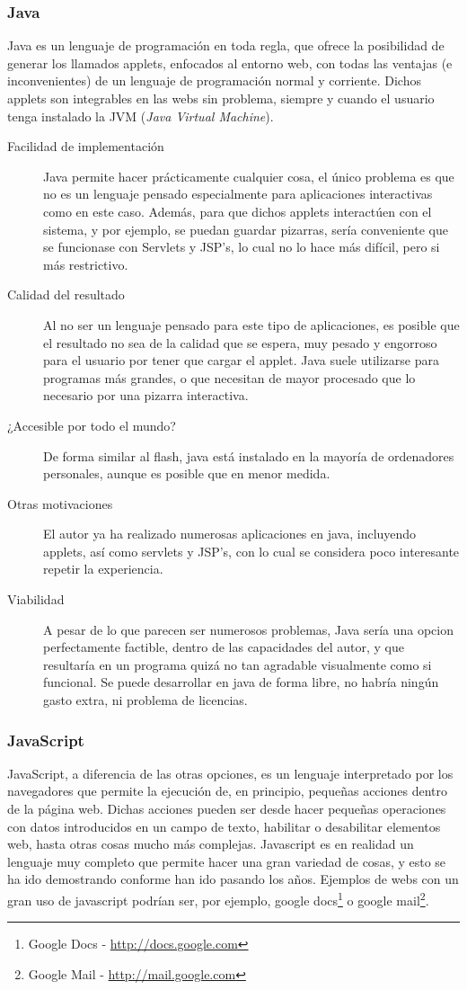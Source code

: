 \subsubsection{Java}
Java es un lenguaje de programación en toda regla, que ofrece la posibilidad de generar los llamados applets, enfocados al entorno web, con todas las ventajas (e inconvenientes) de un lenguaje de programación normal y corriente. Dichos applets son integrables en las webs sin problema, siempre y cuando el usuario tenga instalado la JVM (\emph{Java Virtual Machine}).

\begin{description}
	\item[Facilidad de implementación] Java permite hacer prácticamente cualquier cosa, el único problema es que no es un lenguaje pensado especialmente para aplicaciones interactivas como en este caso. Además, para que dichos applets interactúen con el sistema, y por ejemplo, se puedan guardar pizarras, sería conveniente que se funcionase con Servlets y JSP's, lo cual no lo hace más difícil, pero si más restrictivo.
	\item[Calidad del resultado] Al no ser un lenguaje pensado para este tipo de aplicaciones, es posible que el resultado no sea de la calidad que se espera, muy pesado y engorroso para el usuario por tener que cargar el applet. Java suele utilizarse para programas más grandes, o que necesitan de mayor procesado que lo necesario por una pizarra interactiva.
	\item[¿Accesible por todo el mundo?] De forma similar al flash, java está instalado en la mayoría de ordenadores personales, aunque es posible que en menor medida.
	\item[Otras motivaciones] El autor ya ha realizado numerosas aplicaciones en java, incluyendo applets, así como servlets y JSP's, con lo cual se considera poco interesante repetir la experiencia.
	\item[Viabilidad] A pesar de lo que parecen ser numerosos problemas, Java sería una opcion perfectamente factible, dentro de las capacidades del autor, y que resultaría en un programa quizá no tan agradable visualmente como si funcional. Se puede desarrollar en java de forma libre, no habría ningún gasto extra, ni problema de licencias.
\end{description}

\subsubsection{JavaScript}
JavaScript, a diferencia de las otras opciones, es un lenguaje interpretado por los navegadores que permite la ejecución de, en principio, pequeñas acciones dentro de la página web. Dichas acciones pueden ser desde hacer pequeñas operaciones con datos introducidos en un campo de texto, habilitar o desabilitar elementos web, hasta otras cosas mucho más complejas. Javascript es en realidad un lenguaje muy completo que permite hacer una gran variedad de cosas, y esto se ha ido demostrando conforme han ido pasando los años. Ejemplos de webs con un gran uso de javascript podrían ser, por ejemplo, google docs\footnote{Google Docs - \url{http://docs.google.com}} o google mail\footnote{Google Mail - \url{http://mail.google.com}}.

